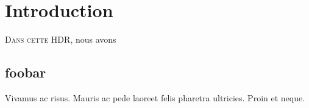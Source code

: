 \documentclass[../these.tex]{subfiles}
\begin{document}
\chapter{Introduction}
\label{chap:introduction}

\ifSubfilesClassLoaded{%
  \tableofcontents
}{%
  \minitoc
}
\vskip2cm

\lettrine{D}{ans cette HDR}, nous avons \\

\section{foobar }
Vivamus ac risus. Mauris ac pede laoreet felis pharetra ultricies. Proin et
neque. 

\end{document}

